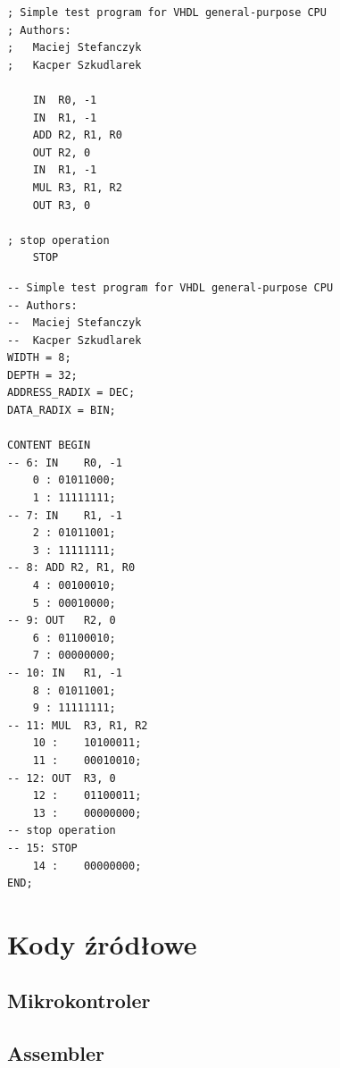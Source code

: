 \documentclass[a4paper,12pt]{report}
\begin{document}
\begin{lstlisting}[caption=Przykładowy kod programu,label=asm_1,language=oasm]
; Simple test program for VHDL general-purpose CPU
; Authors:
; 	Maciej Stefanczyk
;	Kacper Szkudlarek

	IN	R0, -1
	IN	R1, -1
	ADD	R2, R1, R0
	OUT	R2, 0
	IN	R1, -1
	MUL	R3, R1, R2
	OUT	R3, 0

; stop operation
	STOP
\end{lstlisting}

\lstset{
tabsize=6
}
\begin{lstlisting}[caption=Plik wynikowy dla źródła z listingu~\ref{asm_1},language=ahdl]
-- Simple test program for VHDL general-purpose CPU
-- Authors:
-- 	Maciej Stefanczyk
--	Kacper Szkudlarek
WIDTH = 8;
DEPTH = 32;
ADDRESS_RADIX = DEC;
DATA_RADIX = BIN;

CONTENT BEGIN
-- 6: IN	R0, -1
	0 :	01011000;
	1 :	11111111;
-- 7: IN	R1, -1
	2 :	01011001;
	3 :	11111111;
-- 8: ADD R2, R1, R0
	4 :	00100010;
	5 :	00010000;
-- 9: OUT	R2, 0
	6 :	01100010;
	7 :	00000000;
-- 10: IN	R1, -1
	8 :	01011001;
	9 :	11111111;
-- 11: MUL	R3, R1, R2
	10 :	10100011;
	11 :	00010010;
-- 12: OUT	R3, 0
	12 :	01100011;
	13 :	00000000;
-- stop operation
-- 15: STOP
	14 :	00000000;
END;
\end{lstlisting}
\lstset{
tabsize=4
}

\chapter{Kody źródłowe}

\section{Mikrokontroler}








\section{Assembler}

\end{document}
